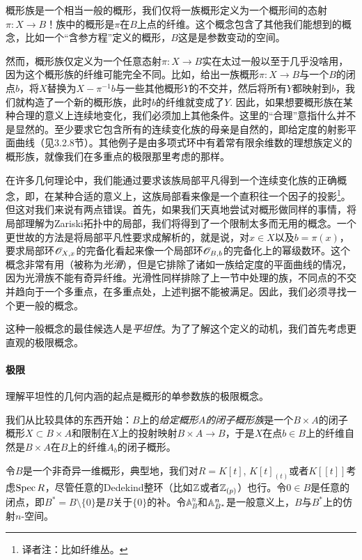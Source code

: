 概形族是一个相当一般的概形，我们仅将一族概形定义为一个概形间的态射$\pi:X\to B$！族中的概形是$\pi$在$B$上点的纤维。这个概念包含了其他我们能想到的概念，比如一个“含参方程”定义的概形，$B$这是是参数变动的空间。

然而，概形族仅定义为一个任意态射$\pi:X\to B$实在太过一般以至于几乎没啥用，因为这个概形族的纤维可能完全不同。比如，给出一族概形$\pi:X\to B$与一个$B$的闭点$b$，将$X$替换为$X-\pi^{-1}b$与一些其他概形$Y$的不交并，然后将所有$Y$都映射到$b$，我们就构造了一个新的概形族，此时$b$的纤维就变成了$Y$. 因此，如果想要概形族在某种合理的意义上连续地变化，我们必须加上其他条件。这里的“合理”意指什么并不是显然的。至少要求它包含所有的连续变化族的母亲是自然的，即给定度的射影平面曲线（见3.2.8节）。其他例子是由多项式环中有着常有限余维数的理想族定义的概形族，就像我们在多重点的极限那里考虑的那样。

在许多几何理论中，我们能通过要求该族局部平凡得到一个连续变化族的正确概念，即，在某种合适的意义上，这族局部看来像是一个直积往一个因子的投影\footnote{译者注：比如纤维丛。}。但这对我们来说有两点错误。首先，如果我们天真地尝试对概形做同样的事情，将局部理解为Zariski拓扑中的局部，我们将得到了一个限制太多而无用的概念。一个更世故的方法是将局部平凡性要求成解析的，就是说，对$x\in X$以及$b=\pi(x)$，要求局部环$\mathscr{O}_{X,x}$的完备化看起来像一个局部环$\mathscr{O}_{B,b}$的完备化上的幂级数环。这个概念非常有用（被称为\textit{光滑}），但是它排除了诸如一族给定度的平面曲线的情况，因为光滑族不能有奇异纤维。光滑性同样排除了上一节中处理的族，不同点的不交并趋向于一个多重点，在多重点处，上述判据不能被满足。因此，我们必须寻找一个更一般的概念。

这种一般概念的最佳候选人是\textit{平坦性}。为了了解这个定义的动机，我们首先考虑更直观的极限概念。

\paragraph*{极限}
理解平坦性的几何内涵的起点是概形的单参数族的极限概念。

我们从比较具体的东西开始：$B$上的\textit{给定概形}$A$\textit{的闭子概形族}是一个$B\times A$的闭子概形$X\subset B\times A$和限制在$X$上的投射映射$B\times A\to B$，于是$X$在点$b\in B$上的纤维自然是$B\times A$在$B$上的纤维$A_b$的闭子概形。

令$B$是一个非奇异一维概形，典型地，我们对$R=K[t]$, $K[t]_{(t)}$或者$K[\![t]\!]$考虑$\operatorname{Spec} R$，尽管任意的Dedekind整环（比如$\mathbb{Z}$或者$\mathbb{Z}_{(p)}$）也行。令$0\in B$是任意的闭点，即$B^*=B\setminus \{0\}$是$B$关于$\{0\}$的补。令$\mathbb{A}_B^n$和$\mathbb{A}_{B^*}^n$是一般意义上，$B$与$B^*$上的仿射$n$-空间。

